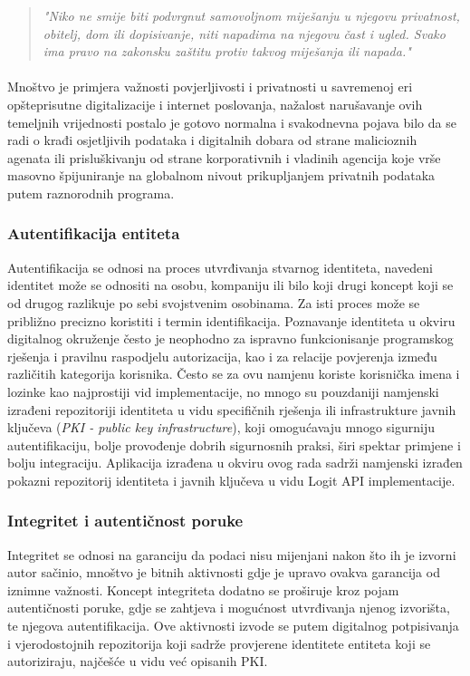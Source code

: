 \begin{quote}
\textit{"Niko ne smije biti podvrgnut samovoljnom miješanju u njegovu privatnost, obitelj, dom ili dopisivanje, niti napadima na njegovu čast i ugled. Svako ima pravo na zakonsku zaštitu protiv takvog miješanja ili napada."}
\end{quote}

\paragraph*{}
Mnoštvo je primjera važnosti povjerljivosti i privatnosti u savremenoj eri opšteprisutne digitalizacije i internet poslovanja, nažalost narušavanje ovih temeljnih vrijednosti postalo je gotovo normalna i svakodnevna pojava bilo da se radi o krađi osjetljivih podataka i digitalnih dobara od strane malicioznih agenata ili prisluškivanju od strane korporativnih i vladinih agencija koje vrše masovno špijuniranje na globalnom nivout prikupljanjem privatnih podataka putem raznorodnih programa\cite{wleaks}.

\subsubsection*{Autentifikacija entiteta}
Autentifikacija se odnosi na proces utvrđivanja stvarnog identiteta, navedeni identitet može se odnositi na osobu, kompaniju ili bilo koji drugi koncept koji se od drugog razlikuje po sebi svojstvenim osobinama. Za isti proces može se približno precizno koristiti i termin identifikacija. Poznavanje identiteta u okviru digitalnog okruženje često je neophodno za ispravno funkcionisanje programskog rješenja i pravilnu raspodjelu autorizacija, kao i za relacije povjerenja između različitih kategorija korisnika. Često se za ovu namjenu koriste korisnička imena i lozinke kao najprostiji vid implementacije, no mnogo su pouzdaniji namjenski izrađeni repozitoriji identiteta u vidu specifičnih rješenja ili infrastrukture javnih ključeva (\textit{PKI - public key infrastructure}), koji omogućavaju mnogo sigurniju autentifikaciju, bolje provođenje dobrih sigurnosnih praksi, širi spektar primjene i bolju integraciju. Aplikacija izrađena u okviru ovog rada sadrži namjenski izrađen pokazni repozitorij identiteta i javnih ključeva u vidu Logit API implementacije.

\subsubsection*{Integritet i autentičnost poruke}
Integritet se odnosi na garanciju da podaci nisu mijenjani nakon što ih je izvorni autor sačinio, mnoštvo je bitnih aktivnosti gdje je upravo ovakva garancija od iznimne važnosti. Koncept integriteta dodatno se proširuje kroz pojam autentičnosti poruke, gdje se zahtjeva i mogućnost utvrđivanja njenog izvorišta, te njegova autentifikacija. Ove aktivnosti izvode se putem digitalnog potpisivanja i vjerodostojnih repozitorija koji sadrže provjerene identitete entiteta koji se autoriziraju, najčešće u vidu već opisanih PKI.

